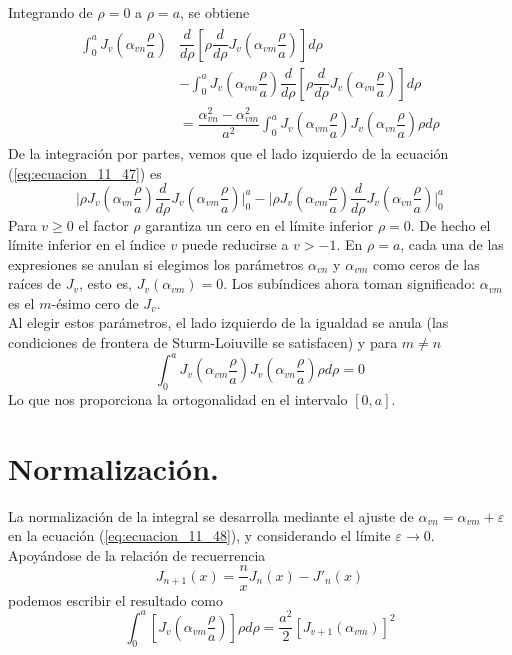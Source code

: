 Integrando de $\rho = 0$ a $\rho = a$, se obtiene
\begin{eqnarray}
\begin{aligned}
\int_{0}^{a} J_{v} \left( \alpha_{vn} \dfrac{\rho}{a} \right) &  \dfrac{d}{d \rho} \left[ \rho \dfrac{d}{d \rho} J_{v} \left( \alpha_{vm} \dfrac{\rho}{a} \right) \right] d \rho \\
& - \int_{0}^{a} J_{v} \left( \alpha_{vm} \dfrac{\rho}{a} \right) \dfrac{d}{d \rho} \left[ \rho \dfrac{d}{d \rho} J_{v} \left( \alpha_{vn} \dfrac{\rho}{a} \right) \right] d \rho \\
&= \dfrac{\alpha^{2}_{vn} - \alpha^{2}_{vm}}{a^{2}} \int_{0}^{a} J_{v} \left( \alpha_{vm} \dfrac{\rho}{a} \right) J_{v} \left( \alpha_{vn} \dfrac{\rho}{a} \right) \rho d \rho
\end{aligned}
\label{eq:ecuacion_11_47}
\end{eqnarray}
De la integración por partes, vemos que el lado izquierdo de la ecuación (\ref{eq:ecuacion_11_47}) es
\begin{equation}
\bigg\vert \rho J_{v} \left( \alpha_{vn} \dfrac{\rho}{a} \right) \dfrac{d}{d \rho} J_{v} \left( \alpha_{vm} \dfrac{\rho}{a} \right) \bigg\vert_{0}^{a} - \bigg\vert \rho J_{v} \left( \alpha_{vm} \dfrac{\rho}{a} \right) \dfrac{d}{d \rho} J_{v} \left( \alpha_{vn} \dfrac{\rho}{a} \right) \bigg\vert_{0}^{a} 
\label{eq:ecuacion_11_48}
\end{equation}
Para $v \geq 0$ el factor $\rho$ garantiza un cero en el límite inferior $\rho = 0$. De hecho el límite inferior en el índice $v$ puede reducirse a $v>-1$. En $\rho = a$, cada una de las expresiones se anulan si elegimos los parámetros $\alpha_{vn}$ y $\alpha_{vm}$ como ceros de las raíces de $J_{v}$, esto es, $J_{v}(\alpha_{vm})=0$. Los subíndices ahora toman significado: $\alpha_{vm}$ es el $m$-ésimo cero de $J_{v}$.
\\
Al elegir estos parámetros, el lado izquierdo de la igualdad se anula (las condiciones de frontera de Sturm-Loiuville se satisfacen) y para $m \neq n$
\begin{equation}
\int_{0}^{a} J_{v} \left( \alpha_{vm} \dfrac{\rho}{a} \right) J_{v} \left( \alpha_{vn} \dfrac{\rho}{a} \right) \rho d \rho = 0
\label{eq:ecuacion_11_49}
\end{equation}
Lo que nos proporciona la ortogonalidad en el intervalo $[0,a]$.
\section{Normalización.}
La normalización de la integral se desarrolla mediante el ajuste de $\alpha_{vn} = \alpha_{vm} + \varepsilon$ en la ecuación (\ref{eq:ecuacion_11_48}), y considerando el límite $\varepsilon \to 0$. Apoyándose de la relación de recuerrencia
\begin{equation}
J_{n+1}(x) = \dfrac{n}{x} J_{n}(x) - J'_{n}(x)
\label{eq:ecuacion_11_16}
\end{equation}
podemos escribir el resultado como
\begin{equation}
\int_{0}^{a} \left[ J_{v} \left( \alpha_{vm} \dfrac{\rho}{a} \right) \right] \rho d \rho = \dfrac{a^{2}}{2} [ J_{v+1} (\alpha_{vm} )]^{2}
\label{eq:ecuacion_11_50}
\end{equation}
